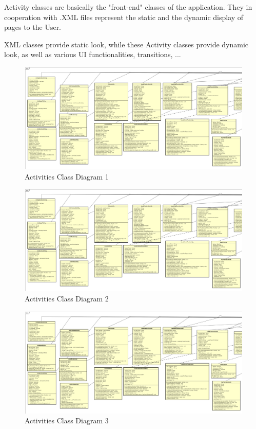 		Activity classes are basically the "front-end" classes of the application. They in cooperation with .XML files represent the static and the dynamic display of pages to the User.
		
		XML classes provide static look, while these Activity classes provide dynamic look, as well as various UI functionalities, transitions, ...
		
		\begin{figure}[H]
			\includegraphics[width=\linewidth]{diagrams/Activities Class Diagram_1.png}
			\caption{Activities Class Diagram 1}
			\label{fig:activities_class_diag_1}
		\end{figure}
		
		\begin{figure}[H]
			\includegraphics[width=\linewidth]{diagrams/Activities Class Diagram_1.png}
			\caption{Activities Class Diagram 2}
			\label{fig:activities_class_diag_2}
		\end{figure}
	
		\begin{figure}[H]
			\includegraphics[width=\linewidth]{diagrams/Activities Class Diagram_1.png}
			\caption{Activities Class Diagram 3}
			\label{fig:activities_class_diag_3}
		\end{figure}
		
